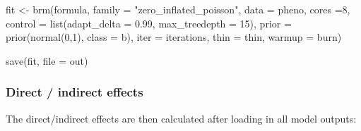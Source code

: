 \documentclass[
  letterpaper,
  DIV=11,
  numbers=noendperiod]{scrreprt}
\newenvironment{Shaded}{}{}
\newcommand{\AttributeTok}[1]{\textcolor[rgb]{0.84,0.23,0.29}{#1}}
\newcommand{\DecValTok}[1]{\textcolor[rgb]{0.00,0.36,0.77}{#1}}
\newcommand{\FloatTok}[1]{\textcolor[rgb]{0.00,0.36,0.77}{#1}}
\newcommand{\FunctionTok}[1]{\textcolor[rgb]{0.44,0.26,0.76}{#1}}
\newcommand{\NormalTok}[1]{\textcolor[rgb]{0.14,0.16,0.18}{#1}}
\newcommand{\OtherTok}[1]{\textcolor[rgb]{0.44,0.26,0.76}{#1}}
\newcommand{\StringTok}[1]{\textcolor[rgb]{0.01,0.18,0.38}{#1}}
\begin{document}
\begin{Shaded}
\begin{Highlighting}[]
\NormalTok{fit }\OtherTok{\textless{}{-}} \FunctionTok{brm}\NormalTok{(formula,}
           \AttributeTok{family =} \StringTok{"zero\_inflated\_poisson"}\NormalTok{,}
           \AttributeTok{data =}\NormalTok{ pheno, }
           \AttributeTok{cores =}\DecValTok{8}\NormalTok{,}
           \AttributeTok{control =} \FunctionTok{list}\NormalTok{(}\AttributeTok{adapt\_delta =} \FloatTok{0.99}\NormalTok{, }\AttributeTok{max\_treedepth =} \DecValTok{15}\NormalTok{),}
           \AttributeTok{prior =} \FunctionTok{prior}\NormalTok{(}\FunctionTok{normal}\NormalTok{(}\DecValTok{0}\NormalTok{,}\DecValTok{1}\NormalTok{), }\AttributeTok{class =}\NormalTok{ b),}
           \AttributeTok{iter =}\NormalTok{ iterations, }
           \AttributeTok{thin =}\NormalTok{ thin, }\AttributeTok{warmup =}\NormalTok{ burn)}

\FunctionTok{save}\NormalTok{(fit, }\AttributeTok{file =}\NormalTok{ out)}
\end{Highlighting}
\end{Shaded}

\subsubsection{Direct / indirect effects}\label{direct-indirect-effects}

The direct/indirect effects are then calculated after loading in all
model outputs:
\end{document}

